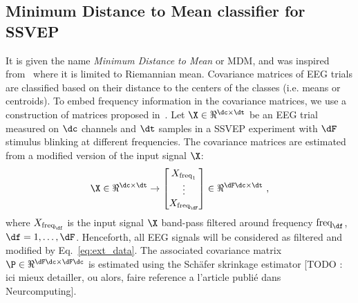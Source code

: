 \subsection{Minimum Distance to Mean classifier for SSVEP}
\label{subsec:mdm}
\iflatexml\else {} \fi
It is given the name \emph{Minimum Distance to Mean} or MDM, and was inspired from~\cite{barachant_multiclass_2012} where it is limited to Riemannian mean.
Covariance matrices of EEG trials are classified based on their distance to the centers of the classes (i.e. means or centroids).
To embed frequency information in the covariance matrices, we use a construction of matrices proposed in~\cite{congedo_new_2013}.
Let $\X \in \Re^{\dc\times\dt}$ be an EEG trial measured on $\dc$ channels and $\dt$ samples in a SSVEP experiment with $\dF$ stimulus blinking at different frequencies.  
The covariance matrices are estimated from a modified version of the input signal $\X$: %
\begin{equation}
	\X \in \Re^{\dc \times \dt} \rightarrow 	
	\begin{bmatrix}
		X_{\text{freq}_1}\\ \vdots \\ X_{\text{freq}_{\dF}} \\
	\end{bmatrix}
	\in \Re^{\dF\dc \times \dt} \ ,
	\label{eq:ext_data}
\end{equation}
where $X_{\text{freq}_\df}$ is the input signal $\X$ band-pass filtered around frequency $\text{freq}_\df$, $\df=1, \ldots, \dF$. Henceforth, all EEG signals will be considered as filtered and modified by Eq.~\eqref{eq:ext_data}.
The associated covariance matrix $\P \in \Re^{\dF\dc \times \dF\dc}$ is estimated using the Sch\"{a}fer skrinkage estimator \cite{schafer_shrinkage_2005} [TODO : ici mieux detailler, ou alors, faire reference a l'article publi\'e dans Neurcomputing].

